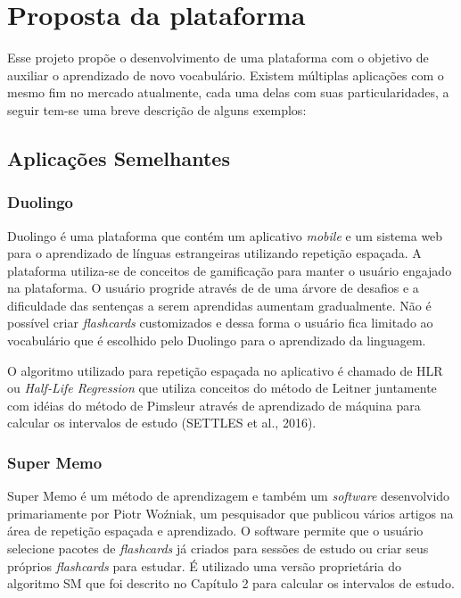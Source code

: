 \chapter{Proposta da plataforma}
Esse projeto propõe o desenvolvimento de uma plataforma com o objetivo de auxiliar o aprendizado de novo vocabulário. Existem múltiplas aplicações com o mesmo fim no mercado atualmente, cada uma delas com suas particularidades, a seguir tem-se uma breve descrição de alguns exemplos:

\section{Aplicações Semelhantes}

\subsection{Duolingo}
Duolingo é uma plataforma que contém um aplicativo \textit{mobile} e um sistema web para o aprendizado de línguas estrangeiras utilizando repetição espaçada. A plataforma utiliza-se de conceitos de gamificação para manter o usuário engajado na plataforma. O usuário progride através de de uma árvore de desafios e a dificuldade das sentenças a serem aprendidas aumentam gradualmente. Não é possível criar \textit{flashcards} customizados e dessa forma o usuário fica limitado ao vocabulário que é escolhido pelo Duolingo para o aprendizado da linguagem.


O algoritmo utilizado para repetição espaçada no aplicativo é chamado de HLR ou \textit{Half-Life Regression} que utiliza conceitos do método de Leitner juntamente com idéias do método de Pimsleur através de aprendizado de máquina para calcular os intervalos de estudo (SETTLES et al., 2016).

\subsection{Super Memo}
Super Memo é um método de aprendizagem e também um \textit{software} desenvolvido primariamente por Piotr Woźniak, um pesquisador que publicou vários artigos na área de repetição espaçada e aprendizado. O software permite que o usuário selecione pacotes de \textit{flashcards} já criados para sessões de estudo ou criar seus próprios \textit{flashcards} para estudar. É utilizado uma versão proprietária do algoritmo SM que foi descrito no Capítulo 2 para calcular os intervalos de estudo.

